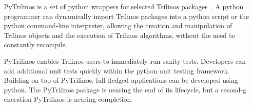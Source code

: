 PyTrilinos is a set of python wrappers for selected Trilinos packages~\cite{PyTrilinos}. A python programmer can dynamically import Trilinos packages into a python script or the python command-line interpreter, allowing the creation and manipulation of Trilinos objects and the execution of Trilinos algorithms, without the need to constantly recompile.

PyTrilinos enables Trilinos users to immediately run sanity tests. Developers can add additional unit tests quickly within the python unit testing framework. Building on top of PyTrilinos, full-fledged applications can be developed using python. The PyTrilinos package is nearing the end of its lifecycle, but a second-g
eneration PyTrilinos is nearing completion.

